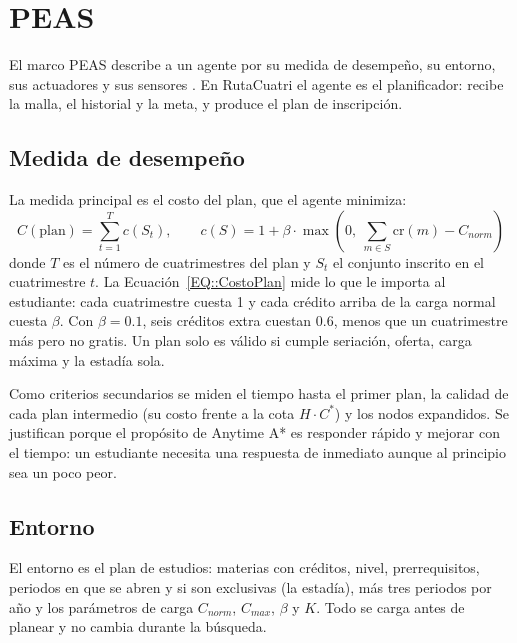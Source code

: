 \section{PEAS}
El marco PEAS describe a un agente por su medida de desempeño, su entorno, sus actuadores y sus sensores \cite{russell2021}. En RutaCuatri el agente es el planificador: recibe la malla, el historial y la meta, y produce el plan de inscripción.

\subsection{Medida de desempeño}
La medida principal es el costo del plan, que el agente minimiza:
\begin{equation}
    \label{EQ::CostoPlan}
    C(\text{plan}) = \sum_{t=1}^{T} c(S_t), \qquad c(S) = 1 + \beta \cdot \max\left(0,\ \textstyle\sum_{m \in S} \mathrm{cr}(m) - C_{norm}\right)
\end{equation}
donde $T$ es el número de cuatrimestres del plan y $S_t$ el conjunto inscrito en el cuatrimestre $t$. La Ecuación~\eqref{EQ::CostoPlan} mide lo que le importa al estudiante: cada cuatrimestre cuesta 1 y cada crédito arriba de la carga normal cuesta $\beta$. Con $\beta = 0.1$, seis créditos extra cuestan 0.6, menos que un cuatrimestre más pero no gratis. Un plan solo es válido si cumple seriación, oferta, carga máxima y la estadía sola.

Como criterios secundarios se miden el tiempo hasta el primer plan, la calidad de cada plan intermedio (su costo frente a la cota $H \cdot C^*$) y los nodos expandidos. Se justifican porque el propósito de Anytime A* es responder rápido y mejorar con el tiempo: un estudiante necesita una respuesta de inmediato aunque al principio sea un poco peor.

\subsection{Entorno}
El entorno es el plan de estudios: materias con créditos, nivel, prerrequisitos, periodos en que se abren y si son exclusivas (la estadía), más tres periodos por año y los parámetros de carga $C_{norm}$, $C_{max}$, $\beta$ y $K$. Todo se carga antes de planear y no cambia durante la búsqueda.

